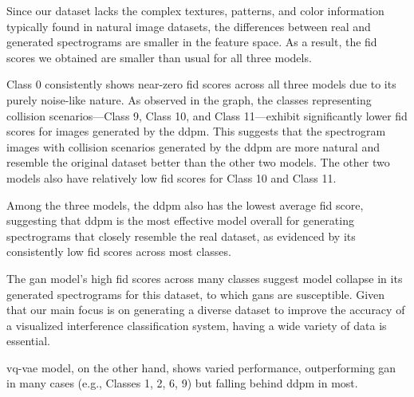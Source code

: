 Since our dataset lacks the complex textures, patterns, and color information typically found in natural image datasets, the differences between real 
and generated spectrograms are smaller in the feature space. As a result, the \gls{fid} scores we obtained are smaller than usual for all three models.

Class 0 consistently shows near-zero \gls{fid} scores across all three models due to its purely noise-like nature. As observed in the graph, the classes 
representing collision scenarios—Class 9, Class 10, and Class 11—exhibit significantly lower \gls{fid} scores for images generated by the \gls{ddpm}. 
This suggests that the spectrogram images with collision scenarios generated by the \gls{ddpm} are more natural and resemble the original dataset better 
than the other two models. The other two models also have relatively low \gls{fid} scores for Class 10 and Class 11.

Among the three models, the \gls{ddpm} also has the lowest average \gls{fid} score, suggesting that \gls{ddpm} is the most effective model overall 
for generating spectrograms that closely resemble the real dataset, as evidenced by its consistently low \gls{fid} scores across most classes.

The \gls{gan} model's high \gls{fid} scores across many classes suggest model collapse in its generated spectrograms for this dataset, to which 
\gls{gan}s are susceptible. Given that our main focus is on generating a diverse dataset to improve the accuracy of a visualized interference 
classification system, having a wide variety of data is essential.

\gls{vq-vae} model, on the other hand, shows varied performance, outperforming \gls{gan} in many cases (e.g., Classes 1, 2, 6, 9) but 
falling behind \gls{ddpm} in most.

